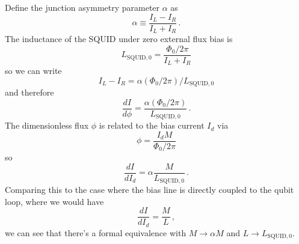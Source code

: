 Define the junction asymmetry parameter $\alpha$ as
\begin{displaymath}
  \alpha \equiv \frac{I_L - I_R}{I_L + I_R} \, .
\end{displaymath}
The inductance of the SQUID under zero external flux bias is
\begin{equation*}
  L_{\text{SQUID},0} = \frac{\Phi_0/2\pi}{I_L + I_R}
\end{equation*}
so we can write
\begin{equation*}
  I_L - I_R = \alpha (\Phi_0/2\pi) / L_{\text{SQUID},0}
\end{equation*}
and therefore
\begin{equation}
  \frac{dI}{d\phi} = \frac{\alpha (\Phi_0/2\pi)}{L_{\text{SQUID},0}} \, .
\end{equation}
The dimensionless flux $\phi$ is related to the bias current $I_d$ via
\begin{equation*}
  \phi = \frac{I_d M}{\Phi_0/2\pi}
\end{equation*}
so
\begin{equation}
  \frac{dI}{dI_d} = \alpha \frac{M}{L_{\text{SQUID},0}} \, .
\end{equation}
Comparing this to the case where the bias line is directly coupled to the qubit loop, where we would have
\begin{equation*}
  \frac{dI}{dI_d} = \frac{M}{L} \, ,
\end{equation*}
we can see that there's a formal equivalence with $M \rightarrow \alpha M$ and $L \rightarrow L_{\text{SQUID},0}$.
